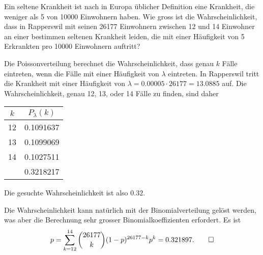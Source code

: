 Ein seltene Krankheit ist nach in Europa üblicher Definition eine
Krankheit, die weniger als 5 von 10000 Einwohnern haben. Wie gross
ist die Wahrscheinlichkeit, dass in Rapperswil mit seinen 26177
Einwohnern zwischen 12 und 14 Einwohner an einer bestimmen
seltenen Krankheit leiden, die mit einer Häufigkeit von 5 Erkrankten
pro 10000 Einwohnern auftritt?

\begin{loesung}
Die Poissonverteilung berechnet die Wahrscheinlichkeit, dass genau
$k$ Fälle eintreten, wenn die Fälle mit einer Häufigkeit
von $\lambda$ eintreten. In Rapperswil tritt die Krankheit mit
einer Häufigkeit von $\lambda=0.00005 \cdot 26177=13.0885$ auf.
Die Wahrscheinlichkeit, genau 12, 13, oder 14 Fälle zu finden, sind
daher
\begin{center}
\begin{tabular}{|c|c|}
\hline
$k$&$P_\lambda(k)$\\
\hline
12&0.1091637\\
13&0.1099069\\
14&0.1027511\\
\hline
  &0.3218217\\
\hline
\end{tabular}
\end{center}
Die gesuchte Wahrscheinlichkeit ist also $0.32$.

Die Wahrscheinlichkeit kann natürlich mit der Binomialverteilung
gelöst werden, was aber die Berechnung sehr grosser Binomialkoeffizienten
erfordert. Es ist
\[
p=\sum_{k=12}^{14}\binom{26177}{k}(1-p)^{26177-k}p^k=0.321897.
\qedhere
\]
\end{loesung}

